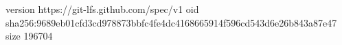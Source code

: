 version https://git-lfs.github.com/spec/v1
oid sha256:9689eb01cfd3cd978873bbfc4fe4dc4168665914f596cd543d6e26b843a87e47
size 196704
